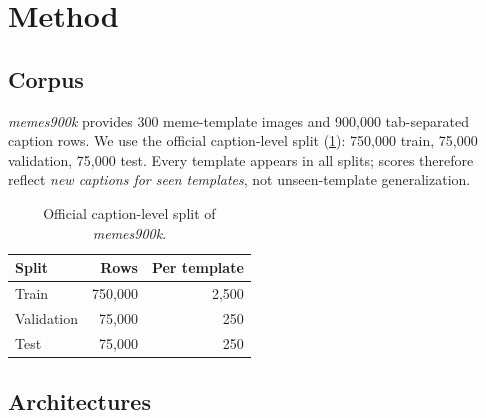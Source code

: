 \documentclass{article}
\theoremstyle{plain}
\theoremstyle{definition}
\theoremstyle{remark}
\begin{document}
\section{Method}
\label{sec:method}

\subsection{Corpus}
\textit{memes900k} provides 300 meme-template images and 900{,}000
tab-separated caption rows. We use the official caption-level split
(\cref{tab:split}): 750{,}000 train, 75{,}000 validation, 75{,}000 test. Every
template appears in all splits; scores therefore reflect \emph{new captions for
seen templates}, not unseen-template generalization.

\begin{table}[t]
\caption{Official caption-level split of \textit{memes900k}.}
\label{tab:split}
\vskip 0.1in
\centering
\small
\begin{tabular}{lrr}
\toprule
Split & Rows & Per template \\
\midrule
Train      & 750{,}000 & 2{,}500 \\
Validation &  75{,}000 &   250 \\
Test       &  75{,}000 &   250 \\
\bottomrule
\end{tabular}
\vskip -0.1in
\end{table}

\subsection{Architectures}
\end{document}
